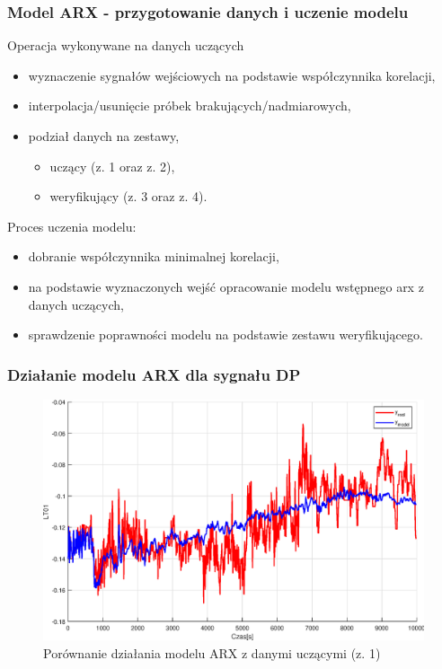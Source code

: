 \begin{frame}
  \frametitle{Model ARX - przygotowanie danych i uczenie modelu}
  \begin{block}{Operacja wykonywane na danych uczących}
    \begin{itemize}
      \item wyznaczenie sygnałów wejściowych na podstawie współczynnika korelacji,
      \item interpolacja/usunięcie próbek brakujących/nadmiarowych,
      \item podział danych na zestawy,
      \begin{itemize}
        \item uczący (z. 1 oraz z. 2),
        \item weryfikujący (z. 3 oraz z. 4).
      \end{itemize}
    \end{itemize}
  \end{block}

  \begin{block}{Proces uczenia modelu:}
    \begin{itemize}
      \item dobranie współczynnika minimalnej korelacji,
      \item na podstawie wyznaczonych wejść opracowanie modelu wstępnego arx z danych uczących,
      \item sprawdzenie poprawności modelu na podstawie zestawu weryfikującego.
    \end{itemize}
  \end{block}
\end{frame}



\begin{frame}
  \frametitle{Działanie modelu ARX dla sygnału DP}
  \begin{figure}[H]
    \centering
    \includegraphics[width=0.75\linewidth,keepaspectratio]{results_matlab/LT01_1.eps}
    \caption{Porównanie działania modelu ARX z danymi uczącymi (z. 1)}
    \label{fig:test}
    \end{figure}
\end{frame}

